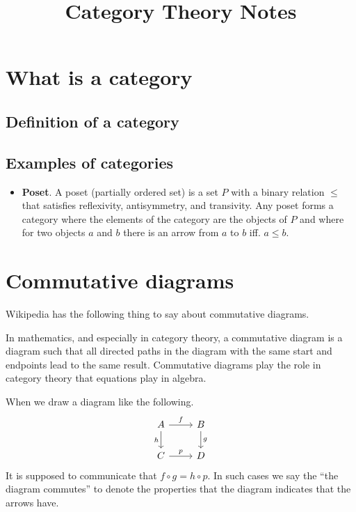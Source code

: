 \documentclass{article}
\title{Category Theory Notes}
\author{}
\theoremstyle{definition}
\begin{document}
\maketitle

\section{What is a category}

\subsection{Definition of a category}
 
\subsection{Examples of categories}

\begin{itemize}
  \item \textbf{Poset}. A poset (partially ordered set) is a set $P$ with a binary
    relation $\leq$ that satisfies reflexivity, antisymmetry, and transivity.
    Any poset forms a category where the elements of the category are the
    objects of $P$ and where for two objects $a$ and $b$ there is an arrow from
    $a$ to $b$ iff. $a \leq b$.
\end{itemize}

\section{Commutative diagrams}

Wikipedia has the following thing to say about commutative diagrams.

\begin{displayquote}
  In mathematics, and especially in category theory, a commutative diagram is a
  diagram such that all directed paths in the diagram with the same start and
  endpoints lead to the same result. Commutative diagrams play the role in
  category theory that equations play in algebra.
\end{displayquote}

When we draw a diagram like the following.
\[
\begin{tikzcd}
  A \arrow[r, "f"] \arrow[d, "h"']
  & B \arrow[d, "g"] \\
  C \arrow[r, "p"] & D
\end{tikzcd}
\]
It is supposed to communicate that $f \circ g = h \circ p$. In such cases we say
the ``the diagram commutes'' to denote the properties that the diagram indicates
that the arrows have.
\end{document}
